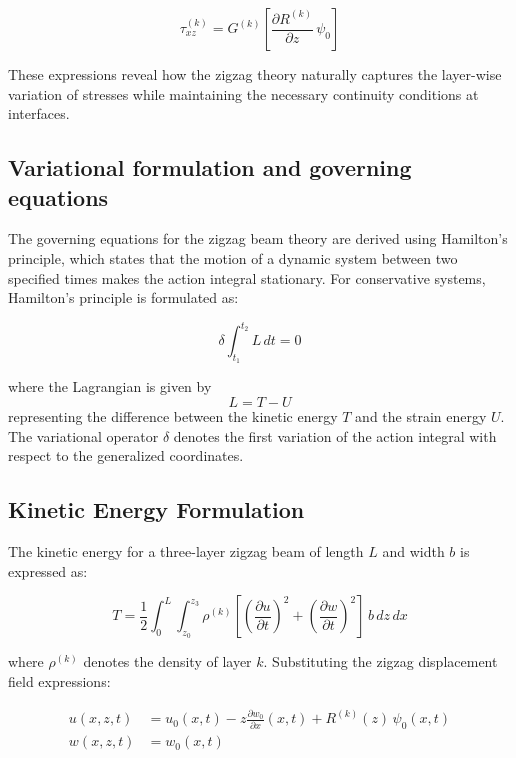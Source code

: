 \documentclass[12pt,a4paper]{report}
\begin{document}
\begin{equation}
\tau_{xz}^{(k)} = G^{(k)} \left[ 
\frac{\partial R^{(k)}}{\partial z} \, \psi_0 
\right]
\end{equation}


These expressions reveal how the zigzag theory naturally captures the layer-wise variation of stresses while maintaining the necessary continuity conditions at interfaces.

\subsection{Variational formulation and governing equations}
\label{sec:variational}


The governing equations for the zigzag beam theory are derived using Hamilton's principle, which states that the motion of a dynamic system between two specified times makes the action integral stationary. For conservative systems, Hamilton's principle is formulated as:

\begin{equation}
\delta \int_{t_1}^{t_2} L \, dt = 0
\end{equation}

where the Lagrangian is given by
\begin{equation}
L = T - U
\end{equation}
representing the difference between the kinetic energy $T$ and the strain energy $U$. The variational operator $\delta$ denotes the first variation of the action integral with respect to the generalized coordinates.

\subsection*{Kinetic Energy Formulation}

The kinetic energy for a three-layer zigzag beam of length $L$ and width $b$ is expressed as:

\begin{equation}
T = \frac{1}{2} \int_0^L \int_{z_0}^{z_3} \rho^{(k)} 
\left[ \left(\frac{\partial u}{\partial t}\right)^2 
     + \left(\frac{\partial w}{\partial t}\right)^2 \right] 
\, b \, dz \, dx
\end{equation}

where $\rho^{(k)}$ denotes the density of layer $k$.  
Substituting the zigzag displacement field expressions:

\begin{align}
u(x,z,t) &= u_0(x,t) - z \frac{\partial w_0}{\partial x}(x,t) 
           + R^{(k)}(z) \, \psi_0(x,t) \\[6pt]
w(x,z,t) &= w_0(x,t)
\end{align}
\end{document}
